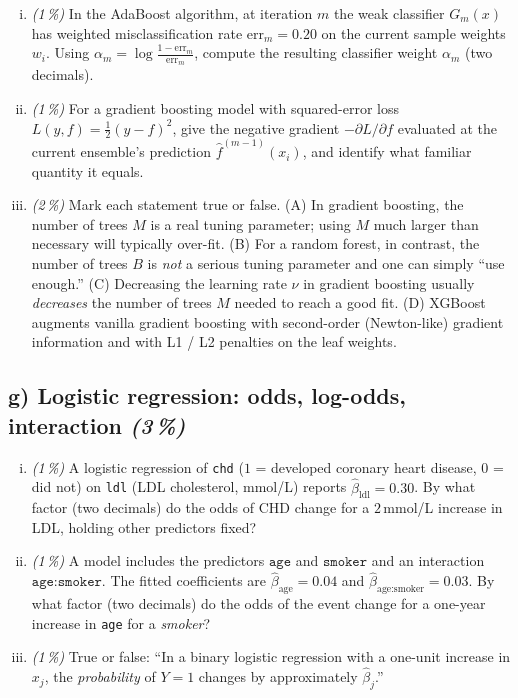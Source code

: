 \documentclass[11pt,a4paper]{article}
\newcommand{\subpoints}[1]{\textit{(#1\,\%)}}
\begin{document}
\begin{enumerate}[(i)]
  \item \subpoints{1} In the AdaBoost algorithm, at iteration $m$ the weak classifier $G_m(x)$ has weighted misclassification rate $\mathrm{err}_m = 0.20$ on the current sample weights $w_i$. Using $\alpha_m = \log\frac{1-\mathrm{err}_m}{\mathrm{err}_m}$, compute the resulting classifier weight $\alpha_m$ (two decimals).
  \item \subpoints{1} For a gradient boosting model with squared-error loss $L(y, f) = \tfrac{1}{2}(y - f)^2$, give the negative gradient $-\partial L / \partial f$ evaluated at the current ensemble's prediction $\hat f^{(m-1)}(x_i)$, and identify what familiar quantity it equals.
  \item \subpoints{2} Mark each statement true or false. (A) In gradient boosting, the number of trees $M$ is a real tuning parameter; using $M$ much larger than necessary will typically over-fit. (B) For a random forest, in contrast, the number of trees $B$ is \emph{not} a serious tuning parameter and one can simply ``use enough.'' (C) Decreasing the learning rate $\nu$ in gradient boosting usually \emph{decreases} the number of trees $M$ needed to reach a good fit. (D) XGBoost augments vanilla gradient boosting with second-order (Newton-like) gradient information and with L1 / L2 penalties on the leaf weights.
\end{enumerate}

\subsection*{g) Logistic regression: odds, log-odds, interaction \subpoints{3}}
\begin{enumerate}[(i)]
  \item \subpoints{1} A logistic regression of \texttt{chd} ($1$ = developed coronary heart disease, $0$ = did not) on \texttt{ldl} (LDL cholesterol, mmol/L) reports $\hat\beta_{\text{ldl}} = 0.30$. By what factor (two decimals) do the odds of CHD change for a $2$\,mmol/L increase in LDL, holding other predictors fixed?
  \item \subpoints{1} A model includes the predictors $\texttt{age}$ and $\texttt{smoker}$ and an interaction $\texttt{age:smoker}$. The fitted coefficients are $\hat\beta_{\text{age}} = 0.04$ and $\hat\beta_{\text{age:smoker}} = 0.03$. By what factor (two decimals) do the odds of the event change for a one-year increase in \texttt{age} for a \emph{smoker}?
  \item \subpoints{1} True or false: ``In a binary logistic regression with a one-unit increase in $x_j$, the \emph{probability} of $Y = 1$ changes by approximately $\hat\beta_j$.''
\end{enumerate}
\end{document}
